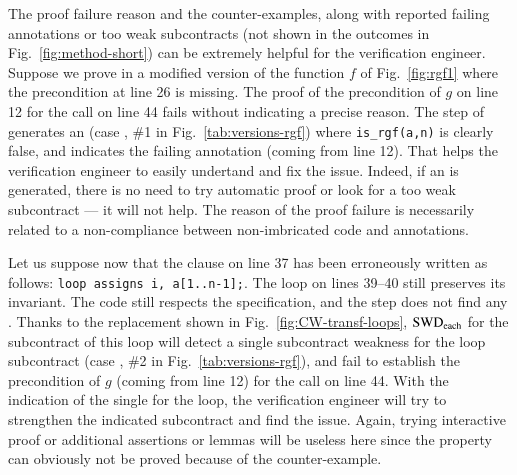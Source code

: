 The proof failure reason and the counter-examples, along with 
reported failing annotations or too weak subcontracts 
(not shown in the outcomes in Fig.~\ref{fig:method-short}) 
can be extremely helpful for the verification engineer. 
Suppose we prove in \Wp a modified version of the function $f$ of Fig.~\ref{fig:rgf1}
where the precondition at line 26 is missing.
The proof of the precondition of $g$ on line 12 for the call on line 44
fails without indicating a precise reason.
The \NCD step of \stady  generates an \NCCE (case ,
\#1 in Fig.~\ref{tab:versions-rgf}) where \lstinline'is_rgf(a,n)'
is clearly false, and indicates the failing annotation (coming from line 12).  
That helps the verification engineer to easily undertand and fix the issue. 
Indeed, if an \NCCE is generated, there is no need to
try automatic proof or look for a too weak subcontract --- it will not help.
The reason of the proof failure is necessarily related 
to a non-compliance between 
non-imbricated code and annotations.

Let us suppose now that the clause on line 37 has been erroneously
written as follows: \lstinline'loop assigns i, a[1..n-1];'.
The loop on lines 39--40 still preserves its invariant. 
The code still respects the specification, and the \NCD step does not find any \NCCE.
Thanks to the replacement shown in Fig.~\ref{fig:CW-transf-loops},
$\mathrm{SWD}_\mathrm{each}$ for the subcontract of this loop will detect a single
subcontract weakness for the loop subcontract (case ,
\#2 in Fig.~\ref{tab:versions-rgf}),
and fail to establish the 
precondition of $g$ (coming from line 12) for the call on line 44.
With the indication of the single \CWCE for the loop, 
the verification engineer will try to strengthen the indicated subcontract
and find the issue. Again, trying interactive proof or additional assertions or lemmas 
will be useless here since the property can obviously not be proved 
because of the counter-example.



